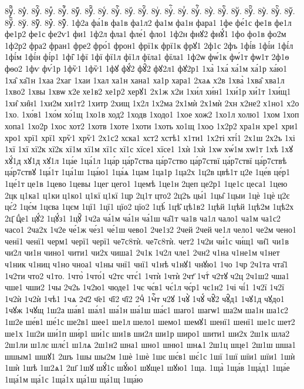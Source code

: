 {8уⷼ҇.
8уⷽ.
8уⷽ҇.
8уⷾ.
8уⷾ҇.
8уⷿ.
8уⷿ҇.
8уꙴ.
8уꙴ҇.
8уꙵ.
8уꙵ҇.
8уꙶ.
8уꙶ҇.
8уꙷ.
8уꙷ҇.
8уꙸ.
8уꙸ҇.
8уꙹ.
8уꙹ҇.
8уꙺ.
8уꙺ҇.
8уꙻ.
8уꙻ҇.
8у꙼.
8у꙼҇.
8у꙽.
8у꙽҇.
1ф2а
фа́1в
фа1в
фа1л2
фа1м
фа1н
фара1
1фе
фе́1с
фе1в
фе1л
фе1р2
фе1с
фе2ѵ1
фи1
1ф2л
фла1
фле́1
фло1
1ф2н
фнꙋ2
фнꙋ́1
1фо
фо1в
фо2м
1ф2р2
фра2
фран1
фре2
фро́1
фрон1
фрї1к
фрї1к
фрꙋ1
2ф1с
2фъ
1фі́в
1фі́и
1фі́л
1фі́м
1фі́н
фі́р1
1фі̑
1фї
1фї
фї1л
фї1л
фїла1
фїла1
1ф2ѡ
фѡ́1к
фѡ́1т
фѡ1т
2ф1ѳ
фѳо2
1фѵ
фѵ́1р
1фѷ1
1фѷ1
1фꙋ
фꙋ́2
фꙋ̑2
фꙋ2л1
фꙋ2р1
1ха̀
1ха́
ха́1м
ха́1р
ха́ю1
1ха̑
ха̑1н
1хаа
2хаг
1хаи
1хал
ха1н
хана1
ха1р
хара1
2хаѧ
х2в
1хва̀
1хва̑
хва1л
1хво2
1хвы
1хвѡ
х2е
хе1в2
хе1р2
херꙋ1
2х1ж
х2и
1хи́л
хи́н1
1хи́1р
хи́1т
1хи́щ1
1хи̑
хи̑н1
1хи2м
хи1т2
1хитр
2хищ
1х2л
1х2ма
2х1мѝ
2х1мѝ
2хн
х2не2
х1но1
х2о
1хо.
1хо́в1
1хо́м
хо́1щ
1хо1в
ход2
1ходв
1ходо1
1хое
хож2
1хо1л
холю1
1хом
1хоп
хопа1
1хо2р
1хос
хот2
1хотв
1хоте
1хоти
1хоть
хо1щ
1хоѻ
1х2р2
хра1н
хре1
хри1
хро1
хрї1
хрї1
хрѷ1
хрѷ1
2х1с2
хска1
хст2
хстѣ1
х1ти1
1х2ті
хті́1
2х1ш
2х2ъ
1хі
1хї
1хї
хї2к
хї2к
хї1м
хї1м
хї1с
хї1с
хїсе1
хїсе1
1хѝ
1хѝ
1хѡ
хѡ́1м
хѡ1т
1хѣ
1хꙋ
хꙋ́1д
хꙋ1д
хꙋ1л
1ца́е
1ца́1л
1ца́р
ца́р7ства
ца́р7ство
ца́р7ствї
ца́р7ствї
ца́р7ствѣ
ца́р7ствꙋ
1ца́1т
1ца́1ш
1ца́ю1
1ца́ѧ
1цам
1ца1р
1ца2х
1ц2в
цвѣ1т
ц2е
1це́в
це́р1
1це́1т
це1в
1цево
1цевы
1цег
цего1
1цемѣ
1це1н
2цеп
це2р1
1це1с
цеса1
1цею
2цк
ц1ка1
ц1ки
ц1ко1
ц1кї
ц1кї
1цр
2ц1т
цто2
2ц2ъ
цы́1
1цы̑
1цыи
1цѐ
1цѐ
ц2є
цє́2
1цє́м
1цєва
1цєм
1цї1
1цї1
цїо2
цїо2
1цѣ́
1цѣ̑
цѣ1в2
1цѣй
1цѣй
1цѣ2м
1цѣ2х
2ц҃
цⷣе1
цꙋ́2
1цꙋ́з1
1цꙋ̑
1ч2а
ча́1м
ча́1н
ча́1ш
ча̑1т
ча1в
ча1л
чало1
ча1м
ча1с2
часо1
2ча2х
1ч2е
че́1ж
че́з1
че́1ш
чево1
2че1з2
2чей
2чей
че1л
чело1
че2м
чено1
ченї1
ченї1
черм1
черї1
черї1
че7с8тѝ.
че7с8тѝ.
чет2
1ч2и
чи́1с
чи́щ1
чи̑1
чи1в
чи2л
чи1н
чино1
чити1
чи2х
чиша1
2ч1к
1ч2л
чле1
2чн2
ч1на
ч1не1м
ч1нет
ч1ник
ч1ниц
ч1но
чноа1
ч1ны
чнї1
чнї1
ч1нѣ
ч1нꙋ1
чнꙋю1
1чо
1чр
2ч1та
чта̑1
1ч2ти
что2
ч1то.
1что̀
1что́1
ч2тє
чтє́1
1чтѝ
1чтѝ
2чт҃
1чтⷭ
ч2тꙋ
ч2ц
2ч1ш2
чша1
чше1
чши2
1чы
2ч2ь
1ч2ю1
чюде1
1чє
чє́в1
чє́1л
чє́р1
чє1н2
1чі
чі́1
1ч2ї
1ч2ї
1ч2ѝ
1ч2ѝ
1чѣ1
1чѧ
2ч҃2
ч҃е1
ч҃ї2
ч҃ї2
2чⷣ
1чⷭ҇т
ч2ꙋ
1чꙋ̀
1чꙋ́
чꙋ̑2
чꙋ̑д1
1чꙋ1д
чꙋдо1
1чꙋж
1чꙋщ
1ш2а
ша́в1
ша́л1
ша́1н
ша́1ш
ша́є1
шаго1
шагѡ1
ша2м
ша1н
ша1с2
1ш2е
ше́в1
ше́1с
ше2в1
шее1
ше1л
шело1
шемо1
шемꙋ1
шенї1
шенї1
ше1с
шет2
ше1х
1ш2и
ши́1п
ши́р1
ши́1с
ши1в
ши2л
ши1р
широ1
шити1
ши2х
2ш1к
шла2
2ш1ли
ш1лє
шлє́1
ш1лѧ
2ш1н2
шна1
шно1
шню1
шнѧ1
2ш1ц
шце1
2ш1ш
шша1
шшым1
шшꙋ1
2шъ
1шы
шы2м
1шѐ
1шѐ
1шє
шє́в1
шє́1с
1шї
1шї
шїи1
шїи1
1шѝ
1шѝ
1шѣ
1ш2ѧ1
2ш҃
1шꙋ
шꙋ́1с
шꙋ́ю1
шꙋще1
шꙋю1
1ща.
1ща̀
1ща́в
1ща́д1
1ща́е
1ща́1м
ща́1с
1ща́1х
ща́1ш
ща́1щ
1ща́ю
}
